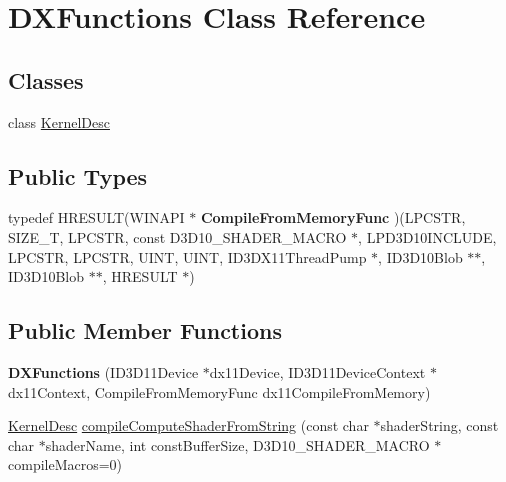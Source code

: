 \hypertarget{class_d_x_functions}{\section{D\+X\+Functions Class Reference}
\label{class_d_x_functions}
}
\subsection*{Classes}
\begin{DoxyCompactItemize}
\item 
class \hyperlink{class_d_x_functions_1_1_kernel_desc}{Kernel\+Desc}
\end{DoxyCompactItemize}
\subsection*{Public Types}
\begin{DoxyCompactItemize}
\item 
\hypertarget{class_d_x_functions_ab5c13b95afc38b8c27a0098a0237e1cc}{typedef H\+R\+E\+S\+U\+L\+T(W\+I\+N\+A\+P\+I $\ast$ {\bfseries Compile\+From\+Memory\+Func} )(L\+P\+C\+S\+T\+R, S\+I\+Z\+E\+\_\+\+T, L\+P\+C\+S\+T\+R, const D3\+D10\+\_\+\+S\+H\+A\+D\+E\+R\+\_\+\+M\+A\+C\+R\+O $\ast$, L\+P\+D3\+D10\+I\+N\+C\+L\+U\+D\+E, L\+P\+C\+S\+T\+R, L\+P\+C\+S\+T\+R, U\+I\+N\+T, U\+I\+N\+T, I\+D3\+D\+X11\+Thread\+Pump $\ast$, I\+D3\+D10\+Blob $\ast$$\ast$, I\+D3\+D10\+Blob $\ast$$\ast$, H\+R\+E\+S\+U\+L\+T $\ast$)}\label{class_d_x_functions_ab5c13b95afc38b8c27a0098a0237e1cc}

\end{DoxyCompactItemize}
\subsection*{Public Member Functions}
\begin{DoxyCompactItemize}
\item 
\hypertarget{class_d_x_functions_a028efb4de186d56954406136e50de228}{{\bfseries D\+X\+Functions} (I\+D3\+D11\+Device $\ast$dx11\+Device, I\+D3\+D11\+Device\+Context $\ast$dx11\+Context, Compile\+From\+Memory\+Func dx11\+Compile\+From\+Memory)}\label{class_d_x_functions_a028efb4de186d56954406136e50de228}

\item 
\hyperlink{class_d_x_functions_1_1_kernel_desc}{Kernel\+Desc} \hyperlink{class_d_x_functions_a0e3bb1fe5f14fe6d31c91543242e9308}{compile\+Compute\+Shader\+From\+String} (const char $\ast$shader\+String, const char $\ast$shader\+Name, int const\+Buffer\+Size, D3\+D10\+\_\+\+S\+H\+A\+D\+E\+R\+\_\+\+M\+A\+C\+R\+O $\ast$compile\+Macros=0)
\end{DoxyCompactItemize}
